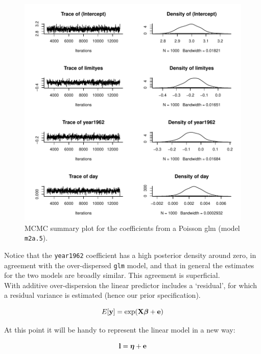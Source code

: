 \documentclass{article}
\begin{document}
\begin{figure}[!h]
\begin{center}
\includegraphics{Lecture2-019}
\end{center}
\caption{MCMC summary plot for the coefficients from a Poisson glm (model \texttt{m2a.5}).}
\label{mcmc.traffic-fig}
\end{figure}

Notice that the \texttt{year1962} coefficient has a high posterior density around zero, in agreement with the over-dispersed \texttt{glm} model, and that in general the estimates for the two models are broadly similar. This agreement is superficial.\\  

With additive over-dispersion the linear predictor includes a `residual', for which a residual variance is estimated (hence our prior specification). 

\begin{equation}
E[{\bf y}] = \textrm{exp}({\bf X}{\bm \beta}+{\bf e})
\end{equation}

At this point it will be handy to represent the linear model in a new way:

\begin{equation}
{\bf l} = {\bm \eta}+{\bf e}
\end{equation}
\end{document}
